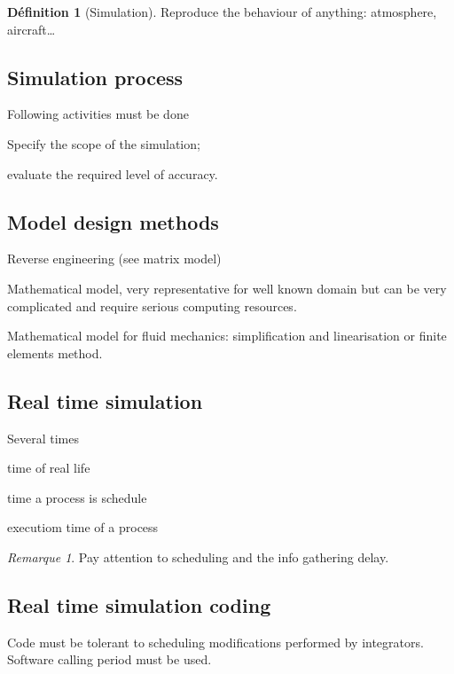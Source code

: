 \documentclass[10pt]{article}
\theoremstyle{plain}
\theoremstyle{definition}
\newtheorem{defn}{Définition}
\theoremstyle{remark}
\newtheorem{rem}{Remarque}
\begin{document}
\begin{defn}
	[Simulation]
	Reproduce the behaviour of anything: atmosphere, aircraft\dots
\end{defn}

\subsection{Simulation process}
Following activities must be done
\begin{compactitem}
	\item Specify the scope of the simulation;
	\item evaluate the required level of accuracy.
\end{compactitem}

\subsection{Model design methods}
\begin{compactitem}
	\item Reverse engineering (see matrix model)
	\item Mathematical model, very representative for well known domain but can
		be very complicated and require serious computing resources.
	\item Mathematical model for fluid mechanics: simplification and
		linearisation or finite elements method.
\end{compactitem}

\subsection{Real time simulation}
Several times
\begin{compactitem}
	\item time of real life
	\item time a process is schedule
	\item executiom time of a process
\end{compactitem}
\begin{rem}
	Pay attention to scheduling and the info gathering delay.
\end{rem}

\subsection{Real time simulation coding}
Code must be tolerant to scheduling modifications performed by integrators.
Software calling period must be used.
\end{document}
